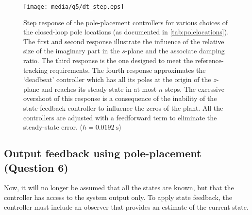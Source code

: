 \begin{figure}[ht]
    \centering
    \texttt{[image: media/q5/dt\_step.eps]}
    \caption{Step response of the pole-placement controllers for various choices of the closed-loop pole locations (as documented in \cref{tab:polelocations}). The first and second response illustrate the influence of the relative size of the imaginary part in the $s$-plane and the associate damping ratio. The third response is the one designed to meet the reference-tracking requirements. The fourth response approximates the `deadbeat' controller which has all its poles at the origin of the $z$-plane and reaches its steady-state in at most $n$ steps. The excessive overshoot of this response is a consequence of the inability of the state-feedback controller to influence the zeros of the plant. All the controllers are adjusted with a feedforward term to eliminate the steady-state error. ($h = \SI{0.0192}{\second}$)}
    \label{fig:q5_step}
\end{figure}

\subsection{Output feedback using pole-placement \textnormal{\phantom{xxx}(Question 6)}}
\label{sec:ss_output}
Now, it will no longer be assumed that all the states are known, but that the controller has access to the system output only. To apply state feedback, the controller must include an observer that provides an estimate of the current state.

